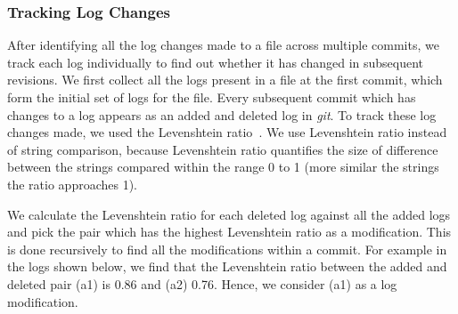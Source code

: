 

\subsubsection{Tracking Log Changes}
After identifying all the log changes made to a file across multiple commits, we track each log individually to find out whether it has changed in subsequent revisions. We first collect all the logs present in a file at the first commit, which form the initial set of logs for the file. Every subsequent commit which has changes to a log appears as an added and deleted log in \textsl{git}. To track these log changes made, we used the Levenshtein ratio~\cite{levenshteinratio}. We use Levenshtein ratio instead of string comparison, because Levenshtein ratio quantifies the size of difference between the strings compared within the range 0 to 1 (more similar the strings the ratio approaches 1). 



We calculate the Levenshtein ratio for each deleted log against all the added logs and pick the pair which has the highest Levenshtein ratio  as a modification. This is done recursively to find all the modifications within a commit. For example in the logs shown below, we find that the Levenshtein ratio between the added and deleted pair (a1) is 0.86 and (a2) 0.76. Hence, we consider (a1) as a log modification.  


